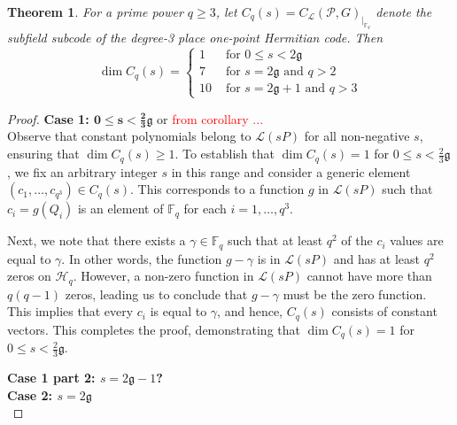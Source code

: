 \documentclass[11pt]{amsart}
\theoremstyle{plain}
\newtheorem{theorem}{Theorem}[section]
\theoremstyle{definition}
\theoremstyle{remark}
\newcommand{\g}{\mathfrak{g}}
\begin{document}
\begin{theorem}
	For a prime power $q \geq 3$, let $C_q (s)=C_{\mathcal{L}}( \mathcal{P},G)_{|_{\mathbb{F}_q}}$ denote the subfield subcode of the degree-3 place one-point Hermitian code. Then 
	\[ \dim C_{q}(s)= \begin{cases} 1 & \text { for } 0 \leq s<2\mathfrak{g} \\ 7 & \text { for } s=2\mathfrak{g} \text{ and } q>2\\ 10 & \text{ for } s=2\g +1 \text{ and } q>3\end{cases}\]
	
	
\end{theorem}
\begin{proof}
	\textbf{Case 1: $\mathbf{0 \leq s <\frac{2}{3}\g}$} or \textcolor{red}{from corollary ...}\\
	Observe that constant polynomials belong to $\mathscr{L}(sP)$ for all non-negative $s$, ensuring that $\dim C_{q}(s)\geq 1$. To establish that $\dim C_{q}(s) = 1$ for $0 \leq s <\frac{2}{3}\g$, we fix an arbitrary integer $s$ in this range and consider a generic element $(c_1,\ldots,c_{q^3}) \in C_{q}(s)$. This corresponds to a function $g$ in $\mathscr{L}(sP)$ such that $c_i=g(Q_i)$ is an element of $\mathbb{F}_q$ for each $i=1,\ldots,q^3$. 
	
	Next, we note that there exists a $\gamma \in \mathbb{F}_q$ such that at least $q^2$ of the $c_i$ values are equal to $\gamma$. In other words, the function $g-\gamma$ is in $\mathscr{L}(sP)$ and has at least $q^2$ zeros on $\mathscr{H}_q$. However, a non-zero function in $\mathscr{L}(sP)$ cannot have more than $q(q-1)$ zeros, leading us to conclude that $g-\gamma$ must be the zero function. This implies that every $c_i$ is equal to $\gamma$, and hence, $C_{q}(s)$ consists of constant vectors. This completes the proof, demonstrating that $\dim C_{q}(s) = 1$ for $0 \leq s <\frac{2}{3}\g$.
	
	\textbf{Case 1 part 2: $s=2\mathfrak{g}-1$?}\\
	
	
	
	\textbf{Case 2: $s=2\mathfrak{g}$}\\
	
	
	

\end{proof}
\end{document}
